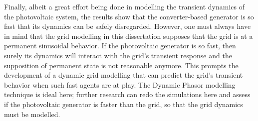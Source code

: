 	Finally, albeit a great effort being done in modelling the transient dynamics of the photovoltaic system, the results show that the converter-based generator is so fast that its dynamics can be safely disregarded. However, one must always have in mind that the grid modelling in this dissertation supposes that the grid is at a permanent sinusoidal behavior. If the photovoltaic generator is so fast, then surely its dynamics will interact with the grid's transient response and the supposition of permanent state is not reasonable anymore. This prompts the development of a dynamic grid modelling that can predict the grid's transient behavior when such fast agents are at play. The Dynamic Phasor modelling technique is ideal here; further research can redo the simulations here and assess if the photovoltaic generator is faster than the grid, so that the grid dynamics must be modelled.
